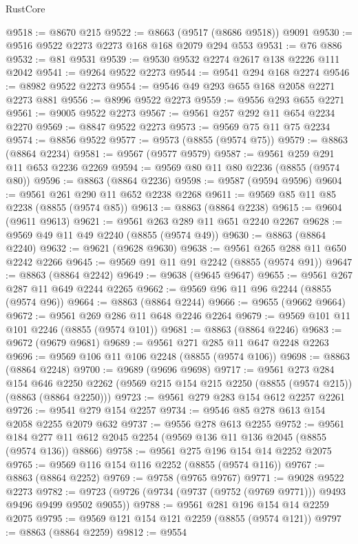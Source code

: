 \begin{lexlean}{RustCore}
\begin{coremodule}
@9518 := @8670 @215
@9522 := @8663 (@9517 (@8686 @9518)) @9091
@9530 := @9516 @9522 @2273 @2273 @168 @168 @2079 @294 @553
@9531 := @76 @886
@9532 := @81 @9531
@9539 := @9530 @9532 @2274 @2617 @138 @2226 @111 @2042
@9541 := @9264 @9522 @2273
@9544 := @9541 @294 @168 @2274
@9546 := @8982 @9522 @2273
@9554 := @9546 @49 @293 @655 @168 @2058 @2271 @2273 @881
@9556 := @8996 @9522 @2273
@9559 := @9556 @293 @655 @2271
@9561 := @9005 @9522 @2273
@9567 := @9561 @257 @292 @11 @654 @2234 @2270
@9569 := @8847 @9522 @2273
@9573 := @9569 @75 @11 @75 @2234
@9574 := @8856 @9522
@9577 := @9573 (@8855 (@9574 @75))
@9579 := @8863 (@8864 @2234)
@9581 := @9567 (@9577 @9579)
@9587 := @9561 @259 @291 @11 @653 @2236 @2269
@9594 := @9569 @80 @11 @80 @2236 (@8855 (@9574 @80))
@9596 := @8863 (@8864 @2236)
@9598 := @9587 (@9594 @9596)
@9604 := @9561 @261 @290 @11 @652 @2238 @2268
@9611 := @9569 @85 @11 @85 @2238 (@8855 (@9574 @85))
@9613 := @8863 (@8864 @2238)
@9615 := @9604 (@9611 @9613)
@9621 := @9561 @263 @289 @11 @651 @2240 @2267
@9628 := @9569 @49 @11 @49 @2240 (@8855 (@9574 @49))
@9630 := @8863 (@8864 @2240)
@9632 := @9621 (@9628 @9630)
@9638 := @9561 @265 @288 @11 @650 @2242 @2266
@9645 := @9569 @91 @11 @91 @2242 (@8855 (@9574 @91))
@9647 := @8863 (@8864 @2242)
@9649 := @9638 (@9645 @9647)
@9655 := @9561 @267 @287 @11 @649 @2244 @2265
@9662 := @9569 @96 @11 @96 @2244 (@8855 (@9574 @96))
@9664 := @8863 (@8864 @2244)
@9666 := @9655 (@9662 @9664)
@9672 := @9561 @269 @286 @11 @648 @2246 @2264
@9679 := @9569 @101 @11 @101 @2246 (@8855 (@9574 @101))
@9681 := @8863 (@8864 @2246)
@9683 := @9672 (@9679 @9681)
@9689 := @9561 @271 @285 @11 @647 @2248 @2263
@9696 := @9569 @106 @11 @106 @2248 (@8855 (@9574 @106))
@9698 := @8863 (@8864 @2248)
@9700 := @9689 (@9696 @9698)
@9717 := @9561
    @273
    @284
    @154
    @646
    @2250
    @2262
    (@9569 @215 @154 @215 @2250 (@8855 (@9574 @215)) (@8863 (@8864 @2250)))
@9723 := @9561 @279 @283 @154 @612 @2257 @2261
@9726 := @9541 @279 @154 @2257
@9734 := @9546 @85 @278 @613 @154 @2058 @2255 @2079 @632
@9737 := @9556 @278 @613 @2255
@9752 := @9561 @184 @277 @11 @612 @2045 @2254 (@9569 @136 @11 @136 @2045 (@8855 (@9574 @136)) @8866)
@9758 := @9561 @275 @196 @154 @14 @2252 @2075
@9765 := @9569 @116 @154 @116 @2252 (@8855 (@9574 @116))
@9767 := @8863 (@8864 @2252)
@9769 := @9758 (@9765 @9767)
@9771 := @9028 @9522 @2273
@9782 := @9723 (@9726 (@9734 (@9737 (@9752 (@9769 @9771))) @9493 @9496 @9499 @9502 @9055))
@9788 := @9561 @281 @196 @154 @14 @2259 @2075
@9795 := @9569 @121 @154 @121 @2259 (@8855 (@9574 @121))
@9797 := @8863 (@8864 @2259)
@9812 := @9554

\end{coremodule}
\end{lexlean}
